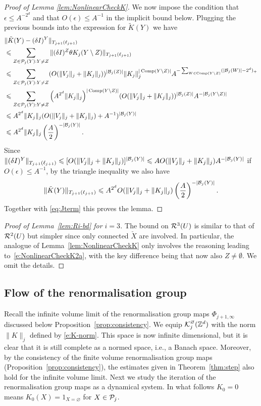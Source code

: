 \documentclass[11pt]{amsart}
\numberwithin{equation}{section}
\numberwithin{theorem}{section}
\newcommand{\1}{{\bf 1}}
\newcommand{\Comp}{\operatorname{Comp}}
\newcommand{\cKbulk}{\cK^\varnothing}
\begin{document}
\begin{proof}[Proof of Lemma \ref{lem:NonlinearCheckK}]
  We now impose the condition that $\epsilon \leq A^{-2^d}$ and that
  $O(\epsilon) \leq A^{-1}$ in the implicit bound below.  Plugging the
  previous bounds into the expression for $\tilde{K}(Y)$ we have
    \begin{align}
      &\|\tilde K(Y)-(\delta I)^Y\|_{T_{j+1}(\ell_{j+1})}
        \nnb
  & \leq  \sum_{Z \in \cP_j(Y):Y \neq Z}
    \|(\delta I)^Z \theta K_j(Y \setminus Z)\|_{T_{j+1}(\ell_{j+1})}
   \nnb
   &\leq  \sum_{Z \in \cP_j(Y):Y \neq Z} 
     (O(\|V_j\|_{j}+ \|K_j\|_{j}))^{|\cB_j(Z)|}{\|K_j\|_j^{|\Comp(Y\backslash Z)|}}
    A^{-\sum_{W\in \Comp(Y\backslash Z)}  (|\cB_j(W)|-2^d)_+}
     \nnb
         &\leq \sum_{Z \in \cP_j(Y):Y \neq Z}
           {\left(A^{2^{d}}\|K_j\|_{j}\right)^{|\Comp(Y\backslash  Z)|}}
           (O(\|V_j\|_{j}+\|K_j\|_{j}))^{|\cB_j(Z)|}A^{-|\cB_{j}(Y\backslash Z)|}
           \nnb
&\leq A^{2^{d}} \|K_j\|_{j}
  (O(\|V_j\|_{j}+ \|K_j\|_{j}) + A^{-1})^{|\cB_{j}(Y)|}
                  \nnb
                  \label{e:NonlinearCheckK2a}
      &\leq A^{2^{d}}\|K_j\|_{j}\left(\frac{A}{2}\right)^{-|\cB_{j}(Y)|} .
\end{align}
Since $\|(\delta I)^Y\|_{T_{j+1}(\ell_{j+1})} \leqslant [O(\|V_j\|_j+\|K_j\|_j)]^{|\mathcal B_j(Y)|} \leqslant A O(\|V_j\|_j+\|K_j\|_j) A^{-|\mathcal B_j(Y)|}$ if $O(\epsilon)\leq A^{-1}$,
by the triangle inequality we also have
\begin{equation}
  \|\tilde K(Y)\|_{T_{j+1}(\ell_{j+1})}
  \leqslant A^{2^{d}}O(\|V_j\|_j+\|K_j\|_{j})\left(\frac{A}{2}\right)^{-|\mathcal B_{j}(Y)|} .
\end{equation}
Together with \eqref{eq:Jterm} this proves the lemma.
\end{proof}

\begin{proof}[Proof of Lemma~\ref{lem:Ri-bd} for $i=3$] 
  The bound on $\mathcal R^3(U)$ is similar to that of $\mathcal R^2(U)$ but simpler
  since only connected $\check{X}$ are involved. In particular,
  the analogue of Lemma~\ref{lem:NonlinearCheckK} only involves the
  reasoning leading to~\eqref{e:NonlinearCheckK2a}, with the key
  difference being that now also $Z\neq\emptyset$. We omit the
  details.
\end{proof} 
\subsection{Flow of the renormalisation group}
\label{sec:flow}

Recall the infinite volume limit of the renormalisation
group maps $\Phi_{j+1,\infty}$ discussed below
Proposition~\ref{prop:consistency}. We equip $\cKbulk_{j}(\Z^{d})$ with the norm $\|K\|_{j}$ defined by \eqref{e:K-norm}.
This space is now infinite dimensional, but it is clear that it is still complete as a normed space, i.e., a Banach space.
Moreover, by the consistency of the finite volume renormalisation group maps (Proposition~\ref{prop:consistency}), the
estimates given in Theorem~\ref{thm:step} also hold for the infinite volume limit.
Next we study the iteration of the renormalisation group maps as a dynamical system.
In what follows $K_0=0$ means $K_0(X)=1_{X=\varnothing}$ for $X\in\mathcal P_j$.
\end{document}
